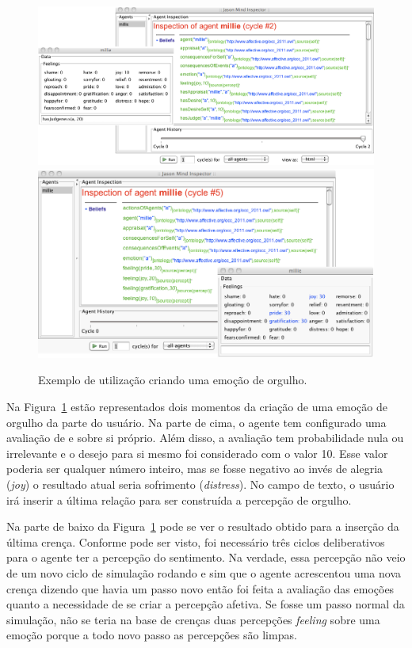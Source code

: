 \begin{figure}
	\begin{center}
		\includegraphics[width=150mm]{figuras/beforeLastInsertionOfPride.png}
		\includegraphics[width=150mm]{figuras/afterLastInsertionOfPride.png}
	\end{center}
	\caption{Exemplo de utilização criando uma emoção de orgulho.}
	\label{fig:testeJasonIntBase}
\end{figure}

Na Figura~\ref{fig:testeJasonIntBase} estão representados dois momentos da
criação de uma emoção de orgulho da parte do usuário. Na parte de cima, o
agente tem configurado uma avaliação de e sobre si próprio. Além disso, a
avaliação tem probabilidade nula ou irrelevante e o desejo para si mesmo foi
considerado com o valor 10. Esse valor poderia ser qualquer número inteiro,
mas se fosse negativo ao invés de alegria (\emph{joy}) o resultado atual seria
sofrimento (\emph{distress}). No campo de texto, o usuário irá inserir a
última relação para ser construída a percepção de orgulho.

Na parte de baixo da Figura~\ref{fig:testeJasonIntBase} pode se ver o
resultado obtido para a inserção da última crença. Conforme pode ser visto,
foi necessário três ciclos deliberativos para o agente ter a percepção do
sentimento. Na verdade, essa percepção não veio de um novo ciclo de simulação
rodando e sim que o agente acrescentou uma nova crença dizendo que havia um
passo novo então foi feita a avaliação das emoções quanto a necessidade de
se criar a percepção afetiva. Se fosse um passo normal da simulação, não se
teria na base de crenças duas percepções \emph{feeling} sobre uma emoção
porque a todo novo passo as percepções são limpas.

